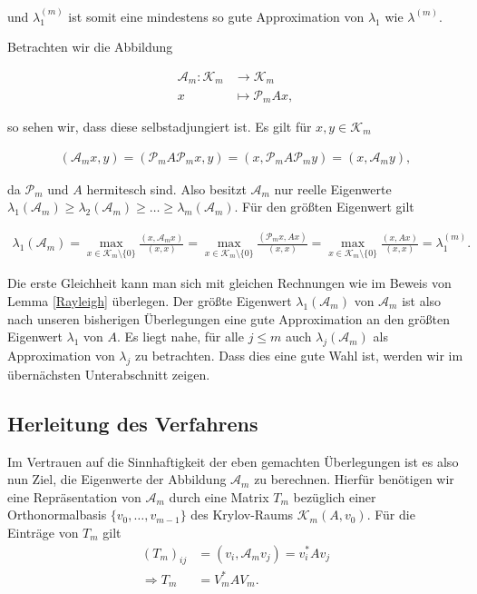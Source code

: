 \documentclass{article}
\begin{document}
\begin{theorem}
und $\lambda_1^{(m)}$ ist somit eine mindestens so gute Approximation von $\lambda_1$ wie $\lambda^{(m)}$.

Betrachten wir die Abbildung

\begin{align*}
	\mathcal{A}_m: \mathcal{K}_m &\to \mathcal{K}_m \\
	x &\mapsto \mathcal{P}_m Ax,
\end{align*}

so sehen wir, dass diese selbstadjungiert ist. Es gilt für $x,y \in \mathcal{K}_m$

\begin{align*}
	(\mathcal{A}_mx, y) = (\mathcal{P}_m A \mathcal{P}_m x, y) = (x, \mathcal{P}_m A \mathcal{P}_m y) = (x, \mathcal{A}_m y),
\end{align*}

da $\mathcal{P}_m$ und $A$ hermitesch sind. Also besitzt $ \mathcal{A}_m$ nur reelle Eigenwerte $\lambda_1(\mathcal{A}_m) \geq \lambda_2(\mathcal{A}_m) \geq \dots \geq \lambda_m(\mathcal{A}_m)$. Für den größten Eigenwert gilt

\begin{align*}
	\lambda_1(\mathcal{A}_m) = \max_{x \in \mathcal{K}_m \setminus \{0\}} \frac{(x, \mathcal{A}_m x)}{(x,x)} = \max_{x \in \mathcal{K}_m \setminus \{0\}} \frac{(\mathcal{P}_m x, A x)}{(x,x)} = \max_{x \in \mathcal{K}_m \setminus \{0\}} \frac{(x, A x)}{(x,x)} = \lambda_1^{(m)}.
\end{align*}

Die erste Gleichheit kann man sich mit gleichen Rechnungen wie im Beweis von Lemma \ref{Rayleigh} überlegen. Der größte Eigenwert $\lambda_1(\mathcal{A}_m)$ von $\mathcal{A}_m$ ist also nach unseren bisherigen Überlegungen eine gute Approximation an den größten Eigenwert $\lambda_1$ von $A$. Es liegt nahe, für alle $j \leq m$ auch $\lambda_j(\mathcal{A}_m)$ als Approximation von $\lambda_j$ zu betrachten. Dass dies eine gute Wahl ist, werden wir im übernächsten Unterabschnitt zeigen.

\subsection{Herleitung des Verfahrens}

Im Vertrauen auf die Sinnhaftigkeit der eben gemachten Überlegungen ist es also nun Ziel, die Eigenwerte der Abbildung $\mathcal{A}_m$ zu berechnen. Hierfür benötigen wir eine Repräsentation von $\mathcal{A}_m$ durch eine Matrix $T_m$ bezüglich einer Orthonormalbasis $\{v_0, \dots, v_{m-1}\}$ des Krylov-Raums $\mathcal{K}_m(A,v_0)$. Für die Einträge von $T_m$ gilt
\begin{align*}
	(T_m)_{ij} &= (v_i, \mathcal{A}_m v_j) = v_i^*Av_j \\
	\Rightarrow T_m &= V_m^*AV_m.
\end{align*}


\end{theorem}
\end{document}
